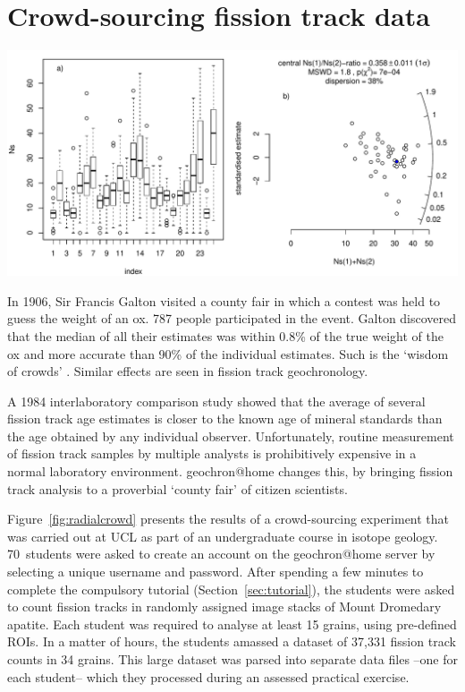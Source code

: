 \documentclass[gchron, manuscript]{copernicus}
\begin{document}
\section{Crowd-sourcing fission track data}\label{sec:crowdsourcing}

{ \centering \includegraphics[width=15cm]{radialcrowd.pdf}
  \label{fig:radialcrowd}
}%

In 1906, Sir Francis Galton visited a county fair in which a contest
was held to guess the weight of an ox. 787 people participated in the
event. Galton discovered that the median of all their estimates was
within 0.8\% of the true weight of the ox and more accurate than 90\%
of the individual estimates. Such is the `wisdom of crowds'
\citep{galton1907a}. Similar effects are seen in fission track
geochronology.\medskip

A 1984 interlaboratory comparison study \citep{miller1985} showed that
the average of several fission track age estimates is closer to the
known age of mineral standards than the age obtained by any individual
observer. Unfortunately, routine measurement of fission track samples
by multiple analysts is prohibitively expensive in a normal laboratory
environment. geochron@home changes this, by bringing fission track
analysis to a proverbial `county fair' of citizen scientists.\medskip

Figure~\ref{fig:radialcrowd} presents the results of a crowd-sourcing
experiment that was carried out at UCL as part of an undergraduate
course in isotope geology. 70~students were asked to create an account
on the geochron@home server by selecting a unique username and
password. After spending a few minutes to complete the compulsory
tutorial (Section~\ref{sec:tutorial}), the students were asked to
count fission tracks in randomly assigned image stacks of Mount
Dromedary apatite. Each student was required to analyse at least 15
grains, using pre-defined ROIs. In a matter of hours, the students
amassed a dataset of 37,331 fission track counts in 34 grains. This
large dataset was parsed into separate data files --one for each
student-- which they processed during an assessed practical
exercise.\medskip
\end{document}
